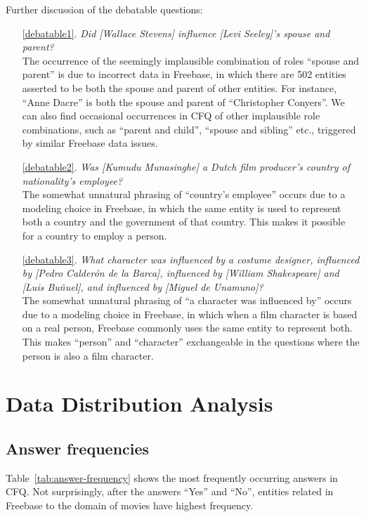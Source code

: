 \documentclass[letterpaper]{article}
\begin{document}
Further discussion of the debatable questions:
\begin{enumerate}
    \item[\ref{debatable1}.] \textit{Did [Wallace Stevens] influence [Levi Seeley]'s spouse and parent?}\\
    The occurrence of the seemingly implausible combination of roles ``spouse and parent'' is due to incorrect data in Freebase, in which there are 502 entities asserted to be both the spouse and parent of other entities. For instance, ``Anne Dacre'' is both the spouse and parent of ``Christopher Conyers''. We can also find occasional occurrences in CFQ of other implausible role combinations, such as ``parent and child'', ``spouse and sibling'' etc., triggered by similar Freebase data issues.
    \item[\ref{debatable2}.] \textit{Was [Kumudu Munasinghe] a Dutch film producer's country of nationality's employee?}\\
    The somewhat unnatural phrasing of ``country's employee'' occurs due to a modeling choice in Freebase, in which the same entity is used to represent both a country and the government of that country. This makes it possible for a country to employ a person.
    \item[\ref{debatable3}.] \textit{What character was influenced by a costume designer, influenced by [Pedro Calder\'{o}n de la Barca], influenced by [William Shakespeare] and [Luis Bu\~{n}uel], and influenced by [Miguel de Unamuno]?}\\
    The somewhat unnatural phrasing of ``a character was influenced by'' occurs due to a modeling choice in Freebase, in which when a film character is based on a real person, Freebase commonly uses the same entity to represent both. This makes ``person'' and ``character'' exchangeable in the questions where the person is also a film character.
\end{enumerate}

\section{Data Distribution Analysis}
\label{suppl:distr}

\subsection{Answer frequencies}

Table~\ref{tab:answer-frequency} shows the most frequently occurring answers in CFQ. Not surprisingly, after the answers ``Yes'' and ``No'', entities related in Freebase to the domain of movies have highest frequency. 
\end{document}
